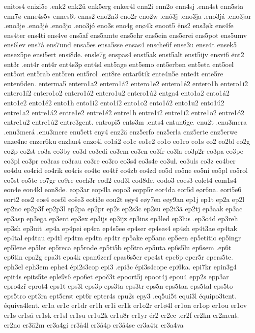 enitos4
enizi5e
.enk2
enk2ü
enk5erg
enker4l
enn2i
enn2o
enn4sj
.enn4st
enn5sta
enn7ø
enne4s5v
ennes6t
enns2
eno2n3
eno2r
eno2w
.enó3j
.eno3ja
.eno3já
.eno3jar
.eno3je
.eno3jé
.eno3jo
.eno3jó
eno3s
eno4g
enø4k
enoot5
ëns2
ens3øk
ens4fe
ens4ter
ens4ti
ens4ve
ens5af
ens5amte
ens5ehr
ens5ein
ens5erei
ens5pot
ens5umv
ens6lev
ens7å
ens7und
ensa5es
ensa5sse
ensas4
ensche6f
ense3u
ense4t
ensek5
ensex5pe
ensi5ert
ensi8de.
ensle7g
enspas4
enst5ak
enst5alt
enst5ijv
ensvi6
ënt2
ent3r
.ent4r
ent4r
ent4s3p
ent4sl
ent5age
ent5emo
ent5erben
ent5eta
ent5oel
ent5ori
ent5rab
ent5ren
ent5rol
.ent8re
entar6tik
ente4n5e
ente4t
ente5re
enten6den.
enterma5
entero1a2
entero1á2
entero1e2
entero1é2
entero1h
entero1i2
entero1í2
entero1o2
entero1ó2
entero1u2
entero1ú2
entga4
ento1a2
ento1á2
ento1e2
ento1é2
ento1h
ento1i2
ento1í2
ento1o2
ento1ó2
ento1u2
ento1ú2
entre1a2
entre1á2
entre1e2
entre1é2
entre1h
entre1i2
entre1í2
entre1o2
entre1ó2
entre1u2
entre1ú2
entre3gent.
entropi5
ents3m
.ents4
entun6ge.
enu2t
.enu3mera
.enu3merá
.enu3mere
enu5ett
eny4
enz2ä
enz5erfo
enz5erla
enz5erte
enz5erwe
enze4ne
enzer6ku
enzlan4
enzo4l
eo1á2
eo1c
eo1e2
eo1o
eo1ro
eo1s
eo2
eo2bl
eo2g
eo2p
eo2st
eo3a
eo3by
eo3d
eo3edi
eo3em
eo3en
eo3fr
eo3la
eo3p2r
eo3pa
eo3pe
eo3pl
eo3pr
eo3ras
eo3rau
eo3re
eo3ro
eo3s4
eo3s4e
eo3ul.
eo3uls
eo3z
eo4ber
eo4du
eo4rid
eo4rik
eo4ris
eo4to
eo4tř
eo4zb
eo4zd
eo5d
eo5ne
eo5ni
eo5pl
eo5rol
eo5st
eo5te
eo7gr
eo9re
eoch3r
eod2
eod3l
eod8de.
eodo3
eoes3
eolet4
eom1s4
eon4e
eon4kl
eon8de.
eop3ar
eop4la
eopo3
eopp5r
eor4da
eor5d
eør6na.
eori5e6
eort2
eos2
eos4
eos6l
eoše3
eoti3e
eou2t
eøy4
eøy7en
eøy9an
ep1j
ep1t
ep2a
ep2l
ep2no
ep2p3f
ep2p3l
ep2pa
ep2pr
ep2s
ep2s3c
ep2su
ep2t3ä
ep2tj
ep3aak
ep3ac
ep3asp
ep3ega
ep3ent
ep3ex
ep3ijs
ep3ijz
ep3ins
ep3led
ep3lus
.ep3o4d
ep3reh
ep3sh
ep3uit
.ep4a
ep4pei
ep4ra
ep4s5ee
ep4ser
ep4ses4
ep4sh
ep4t3ae
ep4tak
ep4tal
ep4tau
ep4tl
ep4tm
ep4tn
ep4tr
ep5ake
ep5anc
ep5een
ep5etitio
ep5ingr
ep5lene
ep5ler
ep5reca
ep5rode
ep5ti5b
ep5tro
ep5uta
ep6s5lu
ep6sem
.ep6t
ep6tin
epa2g
epa3t
epa4k
epan6zerf
epas6s5er
epe4st
epe6p
eper5r
epers5te.
eph3el
eph3em
ephe4
épi2s3cop
epi3
.epi3c
épi3s4cope
epi6ka.
epi7kr
epin3g4
epit4s
epits5te
eple9s6
epo6et
epoč3t
epoort5j
epoot4j
epou4
epp2s
epp3ar
epro4zř
eprot4
eps1t
eps3l
eps3p
eps3ta
eps3tr
eps5n
eps5taa
eps5tal
eps5to
eps5tro
ept3ra
ept5erst
ept6r
epter4s
epu2s
epy3
.eq5ui5t
equi3l
équipo3tent.
équiva4lent.
er1a
er1c
er1dr
er1h
er1i
er1k
er1o2r
er1ø4l
er1on
er1op
er1ou
er1ov
er1s
er1så
er1sk
er1sl
er1su
er1u2k
er1u8r
er1yr
ér2
er2ec
.er2f
er2kn
er2ment.
er2no
er3ä2m
er3a4gi
er3å4l
er3å4p
er3å4se
er3a4tr
er3a4va
